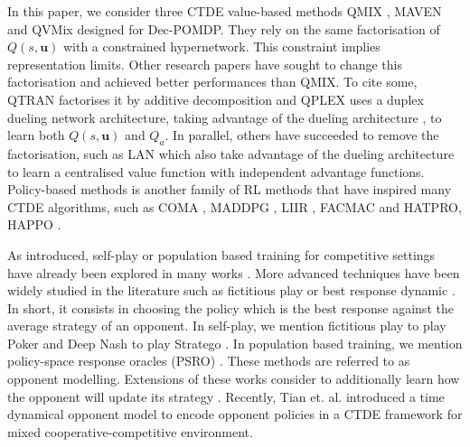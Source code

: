In this paper, we consider three CTDE value-based methods QMIX \citep{Rashid2018}, MAVEN \citep{Mahajan2019MAVEN:Exploration} and QVMix \citep{leroy2020qvmix} designed for Dec-POMDP.
They rely on the same factorisation of $Q(s, \mathbf{u})$ with a constrained hypernetwork.
This constraint implies representation limits.
Other research papers have sought to change this factorisation and achieved better performances than QMIX.
To cite some, QTRAN \citep{Son2019QTRAN:Learning} factorises it by additive decomposition and QPLEX \citep{wang2021qplex} uses a duplex dueling network architecture, taking advantage of the dueling architecture \citep{wang2016dueling}, to learn both $Q(s, \mathbf{u})$ and $Q_a$.
In parallel, others have succeeded to remove the factorisation, such as LAN \citep{avalos2021local} which also take advantage of the dueling architecture \citep{wang2016dueling} to learn a centralised value function with independent advantage functions.
Policy-based methods is another family of RL methods that have inspired many CTDE algorithms, such as COMA \citep{Foerster2017}, MADDPG \citep{lowe2017multi}, LIIR \citep{Du2019LIIRLearning}, FACMAC \citep{peng2021facmac} and HATPRO, HAPPO \citep{kuba2021trust}.


As introduced, self-play or population based training for competitive settings have already been explored in many works \citep{jaderberg2019human, vinyals2019grandmaster, baker2019emergent}.
More advanced techniques have been widely studied in the literature such as fictitious play \cite{brown1951iterative} or best response dynamic \citep{baudin2022fictitious}.
In short, it consists in choosing the policy which is the best response against the average strategy of an opponent.
In self-play, we mention fictitious play to play Poker \citep{pmlr-v37-heinrich15} and Deep Nash to play Stratego \citep{DM_stratego}.
In population based training, we mention policy-space response oracles (PSRO) \citep{NIPS2017_3323fe11, Muller2020A}.
These methods are referred to as opponent modelling.
Extensions of these works consider to additionally learn how the opponent will update its strategy \citep{he2016opponent, foerster2017learning}.
Recently, Tian et. al. \citep{tian2022multi} introduced a time dynamical opponent model to encode opponent policies in a CTDE framework for mixed cooperative-competitive environment.



